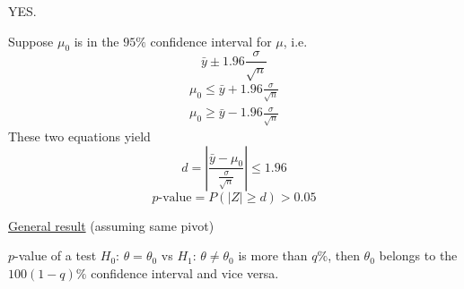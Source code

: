 YES\@.

Suppose $ \mu_0 $ is in the $ 95\% $ confidence interval for $ \mu $, i.e.
\[ \bar{y}\pm 1.96 \frac{\sigma}{\sqrt{n}} \]
\[ \begin{aligned}
        \mu_0\leqslant \bar{y}+1.96 \frac{\sigma}{\sqrt{n}} \\
        \mu_0\geqslant \bar{y}-1.96 \frac{\sigma}{\sqrt{n}}
    \end{aligned}
\]
These two equations yield
\[ d=\left|\frac{\bar{y}-\mu_0}{\frac{\sigma}{\sqrt{n}}} \right|\leqslant 1.96 \]
\[ p\text{-value}=P(|Z|\geqslant d)>0.05 \]

\underline{General result} (assuming same pivot)

$ p $-value of a test $ H_0 $: $ \theta=\theta_0 $ vs $ H_1 $: $ \theta\neq \theta_0 $
is more than $ q\% $, then $ \theta_0 $ belongs to the $ 100(1-q)\% $
confidence interval and vice versa.

